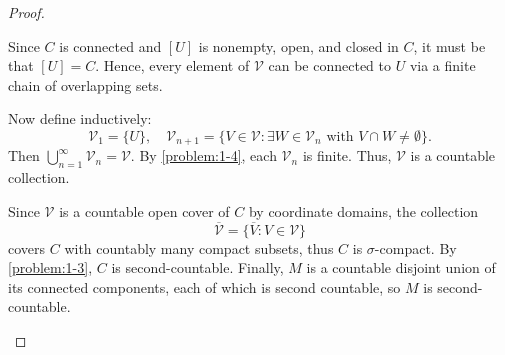 \begin{problem}
\begin{proof}
\begin{enumerate}
      Since $C$ is connected and $[U]$ is nonempty, open, and closed in $C$, it must be that $[U] = C$. Hence, every element of $\mathcal{V}$ can be connected to $U$ via a finite chain of overlapping sets.

      Now define inductively:
      \[
        \mathcal{V}_1 = \{U\}, \quad \mathcal{V}_{n+1} = \{V \in \mathcal{V} \colon \exists W \in \mathcal{V}_n \text{ with } V \cap W \neq \emptyset \}.
      \]
      Then $\bigcup_{n=1}^\infty \mathcal{V}_n = \mathcal{V}$. By \cref{problem:1-4}, each $\mathcal{V}_n$ is finite. Thus, $\mathcal{V}$ is a countable collection.

      Since $\mathcal{V}$ is a countable open cover of $C$ by coordinate domains, the collection
      \[
      \overline{\mathcal{V}} = \{\overline{V} \colon V \in \mathcal{V}\}
      \]
      covers $C$ with countably many compact subsets, thus $C$ is $\sigma$-compact. By \cref{problem:1-3}, $C$ is second-countable.
      Finally, $M$ is a countable disjoint union of its connected components, each of which is second countable, so $M$ is second-countable.
    \end{enumerate}
  \end{proof}
\end{problem}

